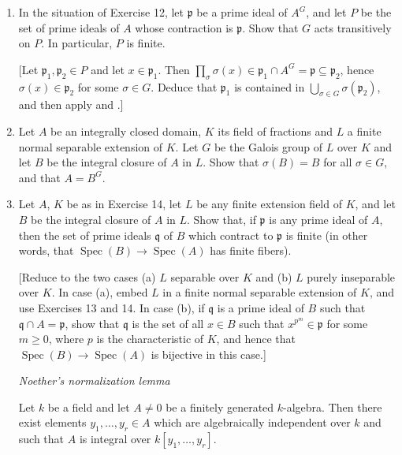 \begin{enumerate}
\item In the situation of Exercise 12, let $\mathfrak p$ be a prime ideal of $A^G$, and let $P$ be the set of prime ideals of $A$ whose contraction is $\mathfrak p$. Show that $G$ acts transitively on $P$. In particular, $P$ is finite.

[Let $\mathfrak p_1,\mathfrak p_2\in P$ and let $x\in\mathfrak p_1$. Then $\prod_\sigma\sigma(x)\in\mathfrak p_1\cap A^G=\mathfrak p\subseteq\mathfrak p_2$, hence $\sigma(x)\in\mathfrak p_2$ for some $\sigma\in G$. Deduce that $\mathfrak p_1$ is contained in $\bigcup_{\sigma\in G}\sigma(\mathfrak p_2)$, and then apply  and .]

\item Let $A$ be an integrally closed domain, $K$ its field of fractions and $L$ a finite normal separable extension of $K$. Let $G$ be the Galois group of $L$ over $K$ and let $B$ be the integral closure of $A$ in $L$. Show that $\sigma(B)=B$ for all $\sigma\in G$, and that $A=B^G$.

\item Let $A$, $K$ be as in Exercise 14, let $L$ be any finite extension field of $K$, and let $B$ be the integral closure of $A$ in $L$. Show that, if $\mathfrak p$ is any prime ideal of $A$, then the set of prime ideals $\mathfrak q$ of $B$ which contract to $\mathfrak p$ is finite (in other words, that $\operatorname{Spec}(B)\longrightarrow\operatorname{Spec}(A)$ has finite fibers).

[Reduce to the two cases (a) $L$ separable over $K$ and (b) $L$ purely inseparable over $K$. In case (a), embed $L$ in a finite normal separable extension of $K$, and use Exercises 13 and 14. In case (b), if $\mathfrak q$ is a prime ideal of $B$ such that $\mathfrak q\cap A=\mathfrak p$, show that $\mathfrak q$ is the set of all $x\in B$ such that $x^{p^m}\in\mathfrak p$ for some $m\geq0$, where $p$ is the characteristic of $K$, and hence that $\operatorname{Spec}(B)\longrightarrow\operatorname{Spec}(A)$ is bijective in this case.]

\noindent\textit{Noether's normalization lemma}

\amstaritem Let $k$ be a field and let $A\neq0$ be a finitely generated $k$-algebra. Then there exist elements $y_1,\ldots,y_r\in A$ which are algebraically independent over $k$ and such that $A$ is integral over $k[y_1,\ldots,y_r]$.


\end{enumerate}
